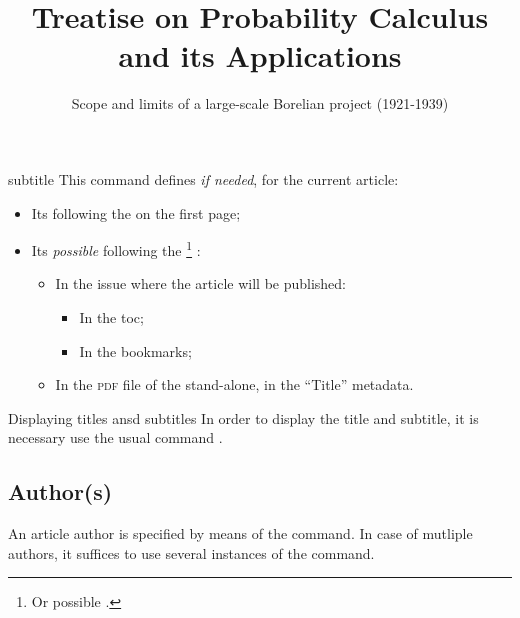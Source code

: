 \documentclass[english,nolocaltoc]{nwejmart}
\newtheorem[style=definition]{fact}
\newtheorem[title-plural=Criteria]{criterion}
\newtheorem[title=random experiment]{rexp}
\begin{document}
\begin{docCommand}{subtitle}{}
  This command defines \emph{if needed}, for the current article:
  \begin{itemize}
  \item Its  following the  on the first page;
  \item Its \emph{possible}  following the
    \footnote{Or possible .} :
    \begin{itemize}
    \item In the issue where the article will be published:
      \begin{itemize}
      \item In the \gls{toc};
      \item In the bookmarks;
      \end{itemize}
    \item In the \textsc{pdf} file of the stand-alone, in the \enquote{Title} metadata.
    \end{itemize}
  \end{itemize}
\end{docCommand}

\begin{bodycode}[listing options={deletekeywords={[2]title}}]
\title[Treatise on Probability Calculus]{Treatise on Probability Calculus and its Applications}
\subtitle[Scope and limits of a Borelian project]{Scope and limits of a large-scale Borelian project (1921-1939)}
\end{bodycode}

\begin{dbremark}{Displaying titles ansd subtitles}{}
  In order to display the title and subtitle, it is necessary use the usual command .
\end{dbremark}

\subsection{Author(s)}
\label{sec-authors}

An article author is specified by means of the  command. In case of mutliple authors, it suffices to use several instances of the command.
\end{document}
